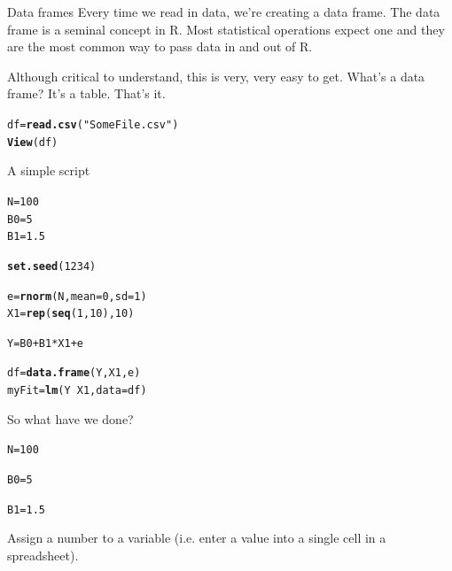 \documentclass[xcolor=dvipsnames]{beamer}
\makeatletter
\newcommand{\hlnum}[1]{\textcolor[rgb]{0.686,0.059,0.569}{#1}}%
\newcommand{\hlstr}[1]{\textcolor[rgb]{0.192,0.494,0.8}{#1}}%
\newcommand{\hlopt}[1]{\textcolor[rgb]{0,0,0}{#1}}%
\newcommand{\hlstd}[1]{\textcolor[rgb]{0.345,0.345,0.345}{#1}}%
\newcommand{\hlkwb}[1]{\textcolor[rgb]{0.69,0.353,0.396}{#1}}%
\newcommand{\hlkwc}[1]{\textcolor[rgb]{0.333,0.667,0.333}{#1}}%
\newcommand{\hlkwd}[1]{\textcolor[rgb]{0.737,0.353,0.396}{\textbf{#1}}}%
\newenvironment{kframe}{%
 \def\at@end@of@kframe{}%
 \ifinner\ifhmode%
  \def\at@end@of@kframe{\end{minipage}}%
  \begin{minipage}{\columnwidth}%
 \fi\fi%
 \def\FrameCommand##1{\hskip\@totalleftmargin \hskip-\fboxsep
 \colorbox{shadecolor}{##1}\hskip-\fboxsep
     \hskip-\linewidth \hskip-\@totalleftmargin \hskip\columnwidth}%
 \MakeFramed {\advance\hsize-\width
   \@totalleftmargin\z@ \linewidth\hsize
   \@setminipage}}%
 {\par\unskip\endMakeFramed%
 \at@end@of@kframe}
\newenvironment{knitrout}{}{} %
\makeatother
\begin{document}
\begin{frame}[fragile]{Data frames}
Every time we read in data, we're creating a data frame. The data frame is a seminal concept in R. Most statistical operations expect one and they are the most common way to pass data in and out of R.

Although critical to understand, this is very, very easy to get. What's a data frame? It's a table. That's it.
\begin{knitrout}
\color{fgcolor}\begin{kframe}
\begin{alltt}
\hlstd{df} \hlkwb{=} \hlkwd{read.csv}\hlstd{(}\hlstr{"SomeFile.csv"}\hlstd{)}
\hlkwd{View}\hlstd{(df)}
\end{alltt}
\end{kframe}
\end{knitrout}

\end{frame}

\begin{frame}[fragile]{A simple script}
\begin{knitrout}
\color{fgcolor}\begin{kframe}
\begin{alltt}
\hlstd{N} \hlkwb{=} \hlnum{100}
\hlstd{B0} \hlkwb{=} \hlnum{5}
\hlstd{B1} \hlkwb{=} \hlnum{1.5}

\hlkwd{set.seed}\hlstd{(}\hlnum{1234}\hlstd{)}

\hlstd{e} \hlkwb{=} \hlkwd{rnorm}\hlstd{(N,} \hlkwc{mean} \hlstd{=} \hlnum{0}\hlstd{,} \hlkwc{sd} \hlstd{=} \hlnum{1}\hlstd{)}
\hlstd{X1} \hlkwb{=} \hlkwd{rep}\hlstd{(}\hlkwd{seq}\hlstd{(}\hlnum{1}\hlstd{,} \hlnum{10}\hlstd{),} \hlnum{10}\hlstd{)}

\hlstd{Y} \hlkwb{=} \hlstd{B0} \hlopt{+} \hlstd{B1} \hlopt{*} \hlstd{X1} \hlopt{+} \hlstd{e}

\hlstd{df} \hlkwb{=} \hlkwd{data.frame}\hlstd{(Y, X1, e)}
\hlstd{myFit} \hlkwb{=} \hlkwd{lm}\hlstd{(Y} \hlopt{~} \hlstd{X1,} \hlkwc{data} \hlstd{= df)}
\end{alltt}
\end{kframe}
\end{knitrout}

\end{frame}

\begin{frame}[fragile]{So what have we done?}
\begin{knitrout}
\color{fgcolor}\begin{kframe}
\begin{alltt}
\hlstd{N} \hlkwb{=} \hlnum{100}

\hlstd{B0} \hlkwb{=} \hlnum{5}

\hlstd{B1} \hlkwb{=} \hlnum{1.5}
\end{alltt}
\end{kframe}
\end{knitrout}

Assign a number to a variable (i.e. enter a value into a single cell in a spreadsheet).
\end{frame}
\end{document}
